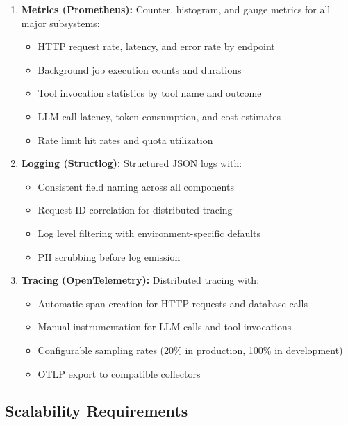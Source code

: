 \begin{enumerate}
    \item \textbf{Metrics (Prometheus):} Counter, histogram, and gauge metrics for all major subsystems:
    \begin{itemize}
        \item HTTP request rate, latency, and error rate by endpoint
        \item Background job execution counts and durations
        \item Tool invocation statistics by tool name and outcome
        \item LLM call latency, token consumption, and cost estimates
        \item Rate limit hit rates and quota utilization
    \end{itemize}
    
    \item \textbf{Logging (Structlog):} Structured JSON logs with:
    \begin{itemize}
        \item Consistent field naming across all components
        \item Request ID correlation for distributed tracing
        \item Log level filtering with environment-specific defaults
        \item PII scrubbing before log emission
    \end{itemize}
    
    \item \textbf{Tracing (OpenTelemetry):} Distributed tracing with:
    \begin{itemize}
        \item Automatic span creation for HTTP requests and database calls
        \item Manual instrumentation for LLM calls and tool invocations
        \item Configurable sampling rates (20\% in production, 100\% in development)
        \item OTLP export to compatible collectors
    \end{itemize}
\end{enumerate}

\subsection{Scalability Requirements}
\label{subsec:nfr-scalability}

